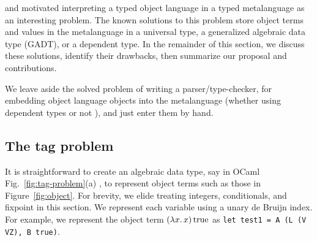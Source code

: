  and \citet{xi-guarded} motivated interpreting
a typed object language in a typed metalanguage as an interesting
problem.  The known solutions to this problem store object terms and
values in the metalanguage in a universal type, a generalized algebraic
data type (GADT), or a dependent type.  In the remainder of this section,
we discuss these solutions, identify their drawbacks, then summarize our
proposal and contributions.  
\begin{comment}
No matter how we represent the object language in the
metalanguage, the representation can be created either by hand (for example, by
entering object terms at a metalanguage interpreter's prompt) or
by a parser\slash type\hyp checker reading from a text string.
We leave aside the solved problem of writing such a parser\slash type\hyp checker,
whether using dependent types \cite{WalidICFP02} or not \cite{baars-typing}.
\end{comment}
We leave aside the solved problem of writing a parser\slash type\hyp checker,
for embedding object language objects into the metalanguage
(whether using dependent types \cite{WalidICFP02} or not \cite{baars-typing}),
and just enter them by hand.

\subsection{The tag problem}\label{tagproblem}

It is straightforward to create an algebraic data type, say in OCaml~%
Fig.~\ref{fig:tag-problem}(a)%
, to
represent object terms such as those in Figure~\ref{fig:object}.
For brevity, we elide treating integers, conditionals, and fixpoint in
this section.
We represent each variable using a unary de Bruijn index.
For example, we represent the object term $(\mathopen{\lambda\mathord{x}.\,}x)\mathinner{\mathrm{true}}$ as
\texttt{let test1 = A (L (V VZ), B true)}.
\begin{comment}
\begin{code}
let test1 = A (L (V VZ), B true)
\end{code}
\end{comment}

